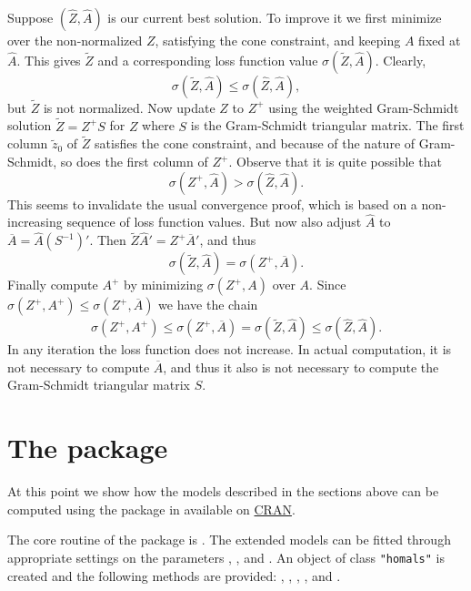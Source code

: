 \documentclass[article]{Z}
\begin{document}
Suppose $(\hat Z,\hat A)$ is our current best solution. To improve it we  first minimize over the non-normalized $Z$, satisfying the cone constraint, and keeping $A$ fixed at $\hat A$. This gives $\tilde Z$ and a corresponding loss function value $\sigma(\tilde Z,\hat A)$. Clearly,
\begin{equation}
\sigma(\tilde Z,\hat A)\leq\sigma(\hat Z,\hat A),
\end{equation}
but $\tilde Z$ is not normalized. Now update $Z$ to $Z^+$ using the weighted Gram-Schmidt solution $\tilde Z=Z^+S$ for $Z$ where $S$ is the Gram-Schmidt triangular matrix. The first column $\tilde z_0$ of $\tilde Z$ satisfies the cone constraint, and because of the nature of Gram-Schmidt, so does the first column of $Z^+$. Observe that it is quite possible that
\begin{equation}
\sigma(Z^+,\hat A)>\sigma(\hat Z,\hat A).
\end{equation}
This seems to invalidate the usual convergence proof, which is based on
a non-increasing sequence of loss function values. But now also adjust
$\hat A$ to $\overline A=\hat A(S^{-1})'$. Then $\tilde Z\hat A'=Z^+\overline A'$, and thus
\begin{equation}
\sigma(\tilde Z,\hat A)=\sigma(Z^+,\overline A).
\end{equation}
Finally compute $A^+$ by minimizing $\sigma(Z^+,A)$ over $A$. Since $\sigma(Z^+,A^+)\leq\sigma(Z^+,\overline A)$ 
we have the chain
\begin{equation}
\sigma(Z^+,A^+)\leq\sigma(Z^+,\overline A)=\sigma(\tilde Z,\hat A)\leq\sigma(\hat Z,\hat A).
\end{equation}
In any iteration the loss function does not increase. In actual computation, it is not necessary to compute 
$\overline A$, and thus it also is not necessary to compute the Gram-Schmidt triangular matrix $S$.

\section[The R package homals]{The  package }
\label{sec:R}
At this point we show how the models described in the sections above can be computed using the package  in  \citep{R:07} available on \href{http://cran.r-project.org}{CRAN}.

The core routine of the package is . The extended models can be fitted through appropriate settings on the parameters , , and . An object of class \texttt{"homals"} is created and the following methods are provided: , , , ,  and . 
\end{document}
